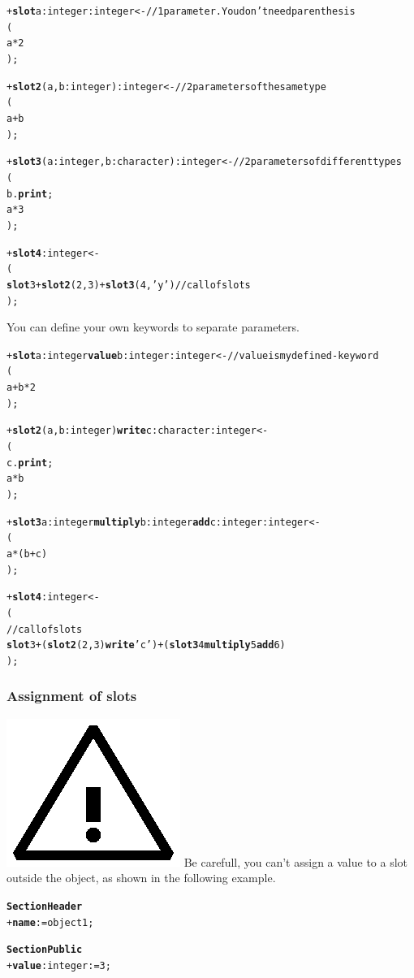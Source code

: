 \documentclass[11pt]{mybook}
\newcommand{\warning}{\includegraphics[scale=0.3]{figures/warning}}
\begin{document}
\begin{alltt}
  + {\bf{}slot} a:{\sc{}integer} :{\sc{}integer} <-    // 1 parameter. You don't need parenthesis
  (
     a * 2
  );

  + {\bf{}slot2} (a,b:{\sc{}integer}) :{\sc{}integer} <-  // 2 parameters of the same type
  (
     a + b
  );

  + {\bf{}slot3} (a:{\sc{}integer},b:{\sc{}character}) :{\sc{}integer}<-// 2 parameters of different types
  (
    b.{\bf{}print};
    a * 3
  );

  + {\bf{}slot4} :{\sc{}integer} <-
  (
    {\bf{}slot} 3 + {\bf{}slot2} (2,3) + {\bf{}slot3} (4,'y')            // call of slots
  );
\end{alltt}

You can define your own keywords to separate parameters.

\begin{alltt}
  + {\bf{}slot} a:{\sc{}integer} {\bf{}value} b:{\sc{}integer} :{\sc{}integer} <- // value is my defined-keyword
  (
     a + b * 2
  );

  + {\bf{}slot2} (a,b:{\sc{}integer}) {\bf{}write} c:{\sc{}character} :{\sc{}integer}  <-
  (
    c.{\bf{}print};
    a * b
  );

  + {\bf{}slot3} a:{\sc{}integer} {\bf{}multiply} b:{\sc{}integer} {\bf{}add} c:{\sc{}integer} :{\sc{}integer}  <-
  (
     a * (b + c)
  );

  + {\bf{}slot4} :{\sc{}integer} <-
  (
    // call of slots
    {\bf{}slot} 3 + ({\bf{}slot2} (2,3) {\bf{}write} 'c') + ({\bf{}slot3} 4 {\bf{}multiply} 5 {\bf{}add} 6)    
  );
\end{alltt}

\subsubsection{Assignment of slots}
\label{quickstart:slots:methods_functions:assignment}
%
\warning{} Be carefull, you can't assign a value to a slot outside the object, as shown in the following example.

\begin{alltt}
{\bf{}Section Header}
  + {\bf{}name}     := {\sc{}object1};

{\bf{}Section Public}
  + {\bf{}value}:{\sc{}integer}  := 3;
\end{alltt}
\end{document}
